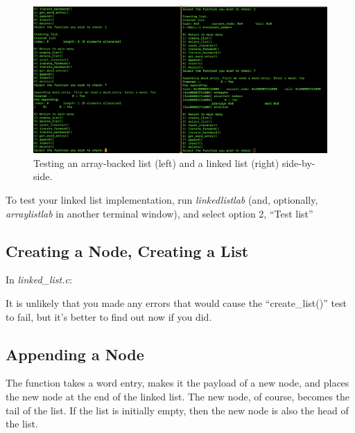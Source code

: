 \begin{figure}
    \centering
    \includegraphics[width=6in]{SideBySideTesting}
    \caption{Testing an array-backed list (left) and a linked list (right) side-by-side.}
    \label{fig:SideBySideTesting}
\end{figure}

To test your linked list implementation, run \textit{linkedlistlab} (and, optionally, \textit{arraylistlab} in another terminal window),
and select option 2, ``Test list''


\subsection{Creating a Node, Creating a List}

In \textit{linked\_list.c}:

\begin{description}
\end{description}

It is unlikely that you made any errors that would cause the ``create\_list()'' test to fail,
but it's better to find out now if you did.


\subsection{Appending a Node}

The  function takes a word entry, makes it the payload of a new node, and places the new node at the end of the linked list.
The new node, of course, becomes the tail of the list.
If the list is initially empty, then the new node is also the head of the list.

